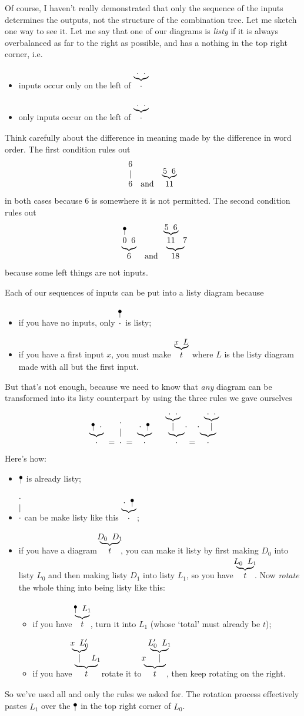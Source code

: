 \documentclass{book}
\begin{document}
Of course, I haven't really demonstrated that only the sequence of the inputs determines the outputs, not the structure of the combination tree. Let me sketch one way to see it. Let me say that one of our diagrams is \emph{listy} if it is always overbalanced as far to the right as possible, and has a nothing in the top right corner, i.e.
\begin{itemize}
\item inputs occur only on the left of $\wye\cdot\cdot\cdot$
\item only inputs occur on the left of $\wye\cdot\cdot\cdot$
\end{itemize}
Think carefully about the difference in meaning made by the difference in word order. The first condition rules out
\[
\wid 6 \quad\mbox{and}\quad \wye56{11}
\]
in both cases because $6$ is somewhere it is not permitted.
The second condition rules out
\[
\wye{\naw0}66 \quad\mbox{and}\quad \wye{\wye56{11}}7{18}
\]
because some left things are not inputs.

Each of our sequences of inputs can be put into a listy diagram because
\begin{itemize}
\item if you have no inputs, only $\naw\cdot$ is listy;
\item if you have a first input $x$, you must make $\wye xLt$ where $L$ is the listy diagram made with all but the first input.
\end{itemize}
But that's not enough, because we need to know that \emph{any} diagram can be transformed into its listy counterpart by using the three rules we gave ourselves
\[
\wye{\naw{}}\cdot\cdot \;=\; \wid\cdot \;=\;\wye\cdot{\naw{}}\cdot \qquad
\wye{\wye\cdot\cdot\mid}\cdot\cdot \;=\; \wye\cdot{\wye\cdot\cdot\mid}\cdot
\]
Here's how:
\begin{itemize}
\item $\naw{}$ is already listy;
\item $\wid\cdot$ can be make listy like this $\wye\cdot{\naw{}}\cdot$;
\item if you have a diagram $\wye{D_0}{D_1}t$, you can make it listy by first making $D_0$ into listy $L_0$ and then making listy $D_1$ into listy $L_1$, so you have $\wye{L_0}{L_1}t$. Now \emph{rotate} the whole thing into being listy like this:
  \begin{itemize}
  \item if you have $\wye{\naw{}}{L_1}t$, turn it into $L_1$ (whose `total' must already be $t$);
  \item if you have $\wye{\wye x{L'_0}\mid}{L_1}t$ rotate it to $\wye x{\wye{L'_0}{L_1}\mid}t$, then keep rotating on the right.
  \end{itemize}
\end{itemize}
So we've used all and only the rules we asked for. The rotation process effectively pastes $L_1$ over the $\naw{}$ in the top right corner of $L_0$.
\end{document}
